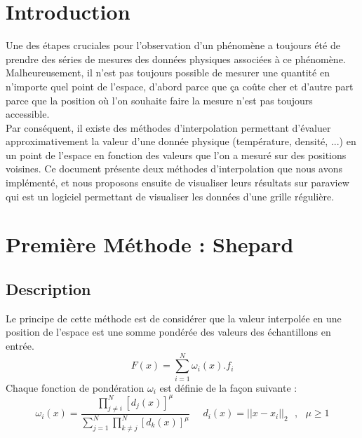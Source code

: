 \documentclass[a4paper,9pt]{article}
\begin{document}
\section{Introduction}
\label{sec:introduction}
Une des étapes cruciales pour l'observation d'un phénomène a toujours été de prendre des séries de mesures des données physiques associées à ce phénomène. Malheureusement, il n'est pas toujours possible de mesurer une quantité en n'importe quel point de l'espace, d'abord parce que ça coûte cher et d'autre part parce que la position où l'on souhaite faire la mesure n'est pas toujours accessible.\\ Par conséquent, il existe des méthodes d'interpolation permettant d'évaluer approximativement la valeur d'une donnée physique (température, densité, ...) en un point de l'espace en fonction des valeurs que l'on a mesuré sur des positions voisines. Ce document présente deux méthodes d'interpolation que nous avons implémenté, et nous proposons ensuite de visualiser leurs résultats sur paraview qui est un logiciel permettant de visualiser les données d'une grille régulière.

\clearpage
\newpage

\section{Première Méthode : Shepard}
\label{sec:shepard}

\subsection{Description}
\label{subsec:shepard_description}
Le principe de cette méthode est de considérer que la valeur interpolée en une position de l'espace est une somme pondérée des valeurs des échantillons en entrée.
$$F(x)=\sum_{i=1}^{N} \omega_{i}(x).f_{i}$$
Chaque fonction de pondération $\omega_{i}$ est définie de la façon suivante :
$$\omega_{i}(x)=\frac{\prod_{j \neq i}^{N}[d_{j}(x)]^{\mu}}{\sum_{j=1}^{N} \prod_{k \neq j}^{N}[d_{k}(x)]^{\mu}} ~~~~~~ d_{i}(x)=||x-x_{i}||_{2}~~~,~~~\mu\ge1$$
\end{document}
